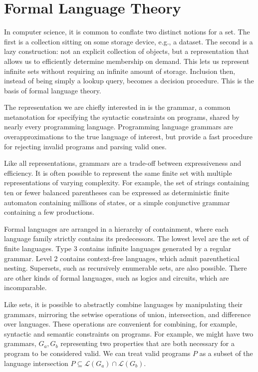 \chapter{\rm\bfseries Formal Language Theory}
\label{ch:chapter01}

In computer science, it is common to conflate two distinct notions for a set. The first is a collection sitting on some storage device, e.g., a dataset. The second is a lazy construction: not an explicit collection of objects, but a representation that allows us to efficiently determine membership on demand. This lets us represent infinite sets without requiring an infinite amount of storage. Inclusion then, instead of being simply a lookup query, becomes a decision procedure. This is the basis of formal language theory.

The representation we are chiefly interested in is the grammar, a common metanotation for specifying the syntactic constraints on programs, shared by nearly every programming language. Programming language grammars are overapproximations to the true language of interest, but provide a fast procedure for rejecting invalid programs and parsing valid ones.

Like all representations, grammars are a trade-off between expressiveness and efficiency. It is often possible to represent the same finite set with multiple representations of varying complexity. For example, the set of strings containing ten or fewer balanced parentheses can be expressed as deterministic finite automaton containing millions of states, or a simple conjunctive grammar containing a few productions.

Formal languages are arranged in a hierarchy of containment, where each language family strictly contains its predecessors. The lowest level are the set of finite languages. Type 3 contains infinite languages generated by a regular grammar. Level 2 contains context-free languages, which admit parenthetical nesting. Supersets, such as recursively enumerable sets, are also possible. There are other kinds of formal languages, such as logics and circuits, which are incomparable.

Like sets, it is possible to abstractly combine languages by manipulating their grammars, mirroring the setwise operations of union, intersection, and difference over languages. These operations are convenient for combining, for example, syntactic and semantic constraints on programs. For example, we might have two grammars, $G_a, G_b$ representing two properties that are both necessary for a program to be considered valid. We can treat valid programs $P$ as a subset of the language intersection $P \subseteq \mathcal{L}(G_a) \cap \mathcal{L}(G_b)$.


\clearpage
